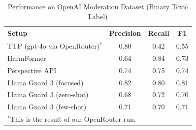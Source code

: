 \documentclass[10pt]{article} %
\begin{document}
\begin{table}[H]
\centering
\begin{tabular}{lccc}
\hline
Setup & Precision & Recall & F1 \\
\hline
TTP (gpt-4o via OpenRouter)$^*$ & 0.80 & 0.42 & 0.55 \\
HarmFormer & 0.64 & 0.84 & 0.73 \\
Perspective API & 0.74 & 0.75 & 0.74 \\
Llama Guard 3 (focused) & 0.82 & 0.80 & 0.81 \\
Llama Guard 3 (zero-shot) & 0.68 & 0.72 & 0.70 \\
Llama Guard 3 (few-shot) & 0.71 & 0.70 & 0.71 \\
\hline
\multicolumn{4}{l}{\small $^*$This is the result of our OpenRouter run.} \\
\end{tabular}
\caption{Performance on OpenAI Moderation Dataset (Binary Toxic Label)}
\label{tab:openai-mod}
\end{table}
\end{document}
